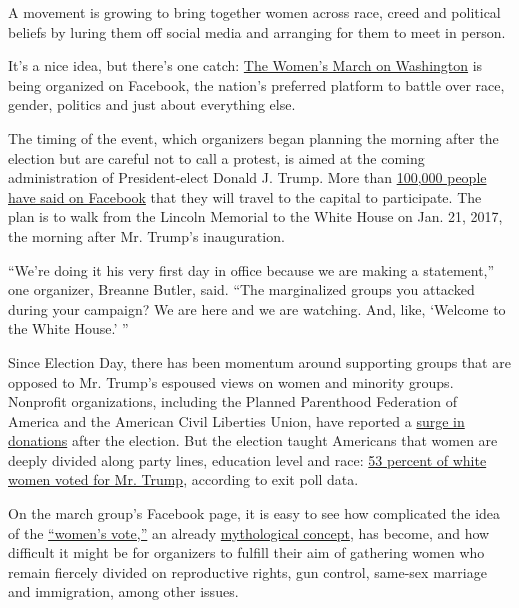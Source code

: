 A movement is growing to bring together women across race, creed and
political beliefs by luring them off social media and arranging for them
to meet in person.

It's a nice idea, but there's one catch:
\href{https://www.facebookcorewwwi.onion/events/2169332969958991/}{The
Women's March on Washington} is being organized on Facebook, the
nation's preferred platform to battle over race, gender, politics and
just about everything else.

The timing of the event, which organizers began planning the morning
after the election but are careful not to call a protest, is aimed at
the coming administration of President-elect Donald J. Trump. More than
\href{https://www.facebookcorewwwi.onion/events/2169332969958991/?active_tab=discussion}{100,000
people have said on Facebook} that they will travel to the capital to
participate. The plan is to walk from the Lincoln Memorial to the White
House on Jan. 21, 2017, the morning after Mr. Trump's inauguration.

``We're doing it his very first day in office because we are making a
statement,'' one organizer, Breanne Butler, said. ``The marginalized
groups you attacked during your campaign? We are here and we are
watching. And, like, `Welcome to the White House.' ''

Since Election Day, there has been momentum around supporting groups
that are opposed to Mr. Trump's espoused views on women and minority
groups. Nonprofit organizations, including the Planned Parenthood
Federation of America and the American Civil Liberties Union, have
reported a
\href{http://www.nytimes3xbfgragh.onion/2016/11/18/us/politics/nonprofit-donations-trump.html}{surge
in donations} after the election. But the election taught Americans that
women are deeply divided along party lines, education level and race:
\href{http://www.nytimes3xbfgragh.onion/2016/12/01/us/politics/white-women-helped-elect-donald-trump.html}{53
percent of white women voted for Mr. Trump}, according to exit poll
data.

On the march group's Facebook page, it is easy to see how complicated
the idea of the
\href{http://www.nytimes3xbfgragh.onion/2016/11/13/opinion/the-myth-of-female-solidarity.html}{``women's
vote,''} an already
\href{http://www.nytimes3xbfgragh.onion/2016/11/15/magazine/the-dream-and-the-myth-of-the-womens-vote.html}{mythological
concept}, has become, and how difficult it might be for organizers to
fulfill their aim of gathering women who remain fiercely divided on
reproductive rights, gun control, same-sex marriage and immigration,
among other issues.

